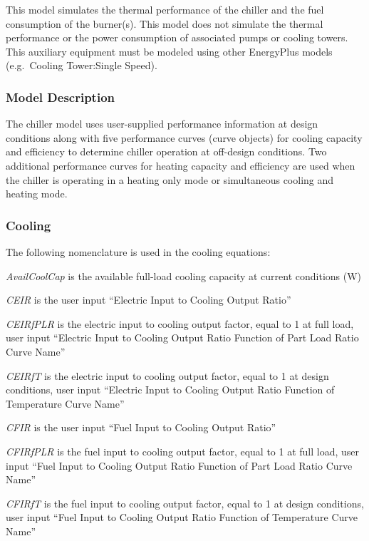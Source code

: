 This model simulates the thermal performance of the chiller and the fuel consumption of the burner(s). This model does not simulate the thermal performance or the power consumption of associated pumps or cooling towers. This auxiliary equipment must be modeled using other EnergyPlus models (e.g.~Cooling Tower:Single Speed).

\subsubsection{Model Description}\label{model-description-006}

The chiller model uses user-supplied performance information at design conditions along with five performance curves (curve objects) for cooling capacity and efficiency to determine chiller operation at off-design conditions. Two additional performance curves for heating capacity and efficiency are used when the chiller is operating in a heating only mode or simultaneous cooling and heating mode.

\subsubsection{Cooling}\label{cooling}

The following nomenclature is used in the cooling equations:

\emph{AvailCoolCap} is the available full-load cooling capacity at current conditions (W)

\emph{CEIR} is the user input ``Electric Input to Cooling Output Ratio''

\emph{CEIRfPLR} is the electric input to cooling output factor, equal to 1 at full load, user input ``Electric Input to Cooling Output Ratio Function of Part Load Ratio Curve Name''

\emph{CEIRfT} is the electric input to cooling output factor, equal to 1 at design conditions, user input ``Electric Input to Cooling Output Ratio Function of Temperature Curve Name''

\emph{CFIR} is the user input ``Fuel Input to Cooling Output Ratio''

\emph{CFIRfPLR} is the fuel input to cooling output factor, equal to 1 at full load, user input ``Fuel Input to Cooling Output Ratio Function of Part Load Ratio Curve Name''

\emph{CFIRfT} is the fuel input to cooling output factor, equal to 1 at design conditions, user input ``Fuel Input to Cooling Output Ratio Function of Temperature Curve Name''

